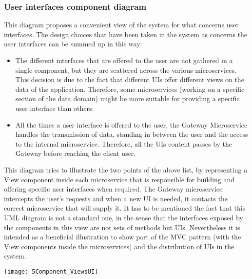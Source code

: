 \subsubsection{User interfaces component diagram}
\begin{minipage}{\linewidth}
	This diagram proposes a convenient view of the system for what concerns user interfaces. The design choices that have been taken in the \app system as concerns the user interfaces can be summed up in this way:
	
	\begin{itemize}
		\item The different interfaces that are offered to the user are not gathered in a single component, but they are scattered across the various microservices. This decision is due to the fact that different UIs offer different views on the data of the application. Therefore, some microservices (working on a specific section of the data domain) might be more suitable for providing a specific user interface than others.
		\item All the times a user interface is offered to the user, the Gateway Microservice handles the transmission of data, standing in between the user and the access to the internal microservice. Therefore, all the UIs content passes by the Gateway before reaching the client user.
	\end{itemize}
	
	This diagram tries to illustrate the two points of the above list, by representing a View component inside each microservice that is responsible for building and offering specific user interfaces when required. 
	The Gateway microservice intercepts the user's requests and when a new UI is needed, it contacts the correct microservice that will supply it.
	It has to be mentioned the fact that this UML diagram is not a standard one, in the sense that the interfaces exposed by the components in this view are not sets of methods but UIs. Nevertheless it is intended as a beneficial illustration to show part of the MVC pattern (with the View components inside the microservices) and the distribution of UIs in the system.
	
	\begin{center}
	\texttt{[image: 5Component\_ViewsUI]}
	\end{center}
	
	
\end{minipage}